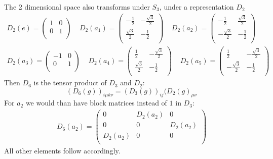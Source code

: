 \documentclass[a4paper]{article}
\theoremstyle{definition}
\theoremstyle{definition}
\theoremstyle{definition}
\theoremstyle{theorem}
\theoremstyle{theorem}
\theoremstyle{definition}
\begin{document}
The 2 dimensional space also transforms under $S_3$, under a representation $D_2$
\begin{align*}
    D_2(e) =
    \begin{pmatrix}
        1 & 0 \\
        0 & 1 \\
    \end{pmatrix} \;\;\;\;
    D_2(a_1) = \begin{pmatrix}
        -\frac{1}{2} & -\frac{\sqrt{3}}{2} \\
        \frac{\sqrt{3}}{2} & -\frac{1}{2} \\
    \end{pmatrix} \;\;\;\;
    D_2(a_2) =
    \begin{pmatrix}
        -\frac{1}{2} & \frac{\sqrt{3}}{2} \\
        -\frac{\sqrt{3}}{2} & -\frac{1}{2} \\
    \end{pmatrix} \;\;\;\; \\
    D_2(a_3) =
    \begin{pmatrix}
        -1 & 0 \\
        0 & 1 \\
    \end{pmatrix} \;\;\;\;
    D_2(a_4) = \begin{pmatrix}
        \frac{1}{2} & -\frac{\sqrt{3}}{2} \\
        \frac{\sqrt{3}}{2} & -\frac{1}{2} \\
    \end{pmatrix} \;\;\;\;
    D_2(a_5) =
    \begin{pmatrix}
        \frac{1}{2} & -\frac{\sqrt{3}}{2} \\
        -\frac{\sqrt{3}}{2} & -\frac{1}{2} \\
    \end{pmatrix} \;\;\;\;
\end{align*}
Then $D_6$ is the tensor product of $D_3$ and $D_2$:
\begin{equation}
    (D_6(g))_{i\mu k\nu}=(D_3(g))_{ij}(D_2(g)_{\mu \nu}
\end{equation}
For $a_2$ we would than have block matrices instead of $1$ in $D_3$:
\begin{align*}
    D_6(a_2) =
    \begin{pmatrix}
        0 & D_2(a_2) & 0 \\
        0 & 0 & D_2(a_2) \\
        D_2(a_2) & 0 & 0 \\
    \end{pmatrix}
\end{align*}
All other elements follow accordingly.
\end{document}
